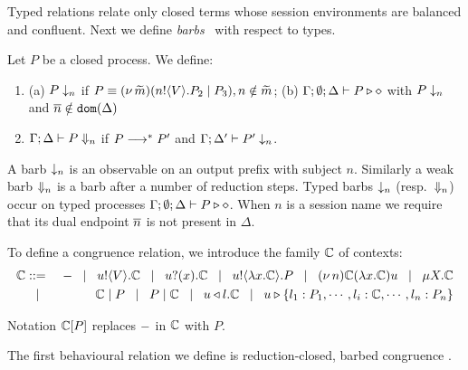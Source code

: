 \noi Typed relations relate only closed terms whose
session environments %
are balanced  and confluent.
Next we define  {\em barbs}~\cite{MiSa92}
with respect to types. 

\begin{definition}[Barbs]\rm
Let $P$ be a closed process. We define:
\begin{enumerate}
		\item	(a) $P \downarrow_{n}$ if $P \equiv (\nu\, \widetilde{m})(n ! \langle V \rangle . P_2 \;|\; P_3), n \notin \widetilde{m}$; %
(b)			$\Gamma; \emptyset; \Delta \vdash P \triangleright \diamond$ with $P \downarrow_{n}$ and $\overline{n} \notin \mathtt{dom}(\Delta)$
\item  
	$\Gamma; \Delta \vdash P \Downarrow_{n}$ if $P \longrightarrow^* P'$ and
			$\Gamma; \Delta' \vdash P' \downarrow_{n}$.			
	\end{enumerate}
\end{definition}

\noi A barb $\downarrow_{n}$ is an observable on an output prefix with subject $n$.
Similarly a weak barb $\Downarrow_{n}$ is a barb after a number of reduction steps.
Typed barbs $\downarrow_{n}$ (resp.\ $\Downarrow_{n}$)
occur on typed processes $\Gamma; \emptyset; \Delta \vdash P \triangleright \diamond$.
When $n$ is a session name we require that its dual endpoint $\overline{n}$ is not present
in %
$\Delta$.

To define a congruence relation, we introduce the family ${\Bbb C}$ of contexts:
\begin{eqnarray*}
	{\Bbb C} & ::= & - \;\;\;|\;\;\; u ! \langle V \rangle . {\Bbb C} \;\;\;|\;\;\; u ? (x) . {\Bbb C} \;\;\;|\;\;\; u ! \langle \lambda x.{\Bbb C} \rangle . P \;\;\;|\;\;\; (\nu\, n) {\Bbb C}
	(\lambda x.{\Bbb C})u \;\;\;|\;\;\; \mu X. {\Bbb C}\\ 
	& \;\;\;|\;\;\; & {\Bbb C} \;|\; P \;\;\;|\;\;\; P \;|\; {\Bbb C} \;\;\;|\;\;\; u \triangleleft l . {\Bbb C} \;\;\;|\;\;\; u \triangleright \{l_1:P_1,\cdots,l_i:{\Bbb C},\cdots,l_n:P_n\}
\end{eqnarray*}

Notation ${\Bbb C}[P]$ replaces 
$-$ in ${\Bbb C}$ with $P$.


\noi The first behavioural relation we define is reduction-closed, barbed congruence \cite{HondaKYoshida95}. 

